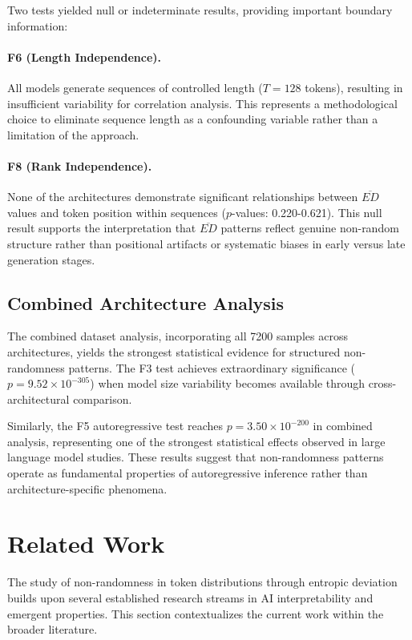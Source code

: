 \documentclass[12pt]{article}
\begin{document}
Two tests yielded null or indeterminate results, providing important boundary information:

\paragraph{F6 (Length Independence).} 
All models generate sequences of controlled length ($T = 128$ tokens), resulting in insufficient variability for correlation analysis. This represents a methodological choice to eliminate sequence length as a confounding variable rather than a limitation of the approach.

\paragraph{F8 (Rank Independence).}
None of the architectures demonstrate significant relationships between $\overline{ED}$ values and token position within sequences ($p$-values: 0.220-0.621). This null result supports the interpretation that $\overline{ED}$ patterns reflect genuine non-random structure rather than positional artifacts or systematic biases in early versus late generation stages.

\subsection{Combined Architecture Analysis}

The combined dataset analysis, incorporating all 7200 samples across architectures, yields the strongest statistical evidence for structured non-randomness patterns. The F3 test achieves extraordinary significance ($p = 9.52 \times 10^{-305}$) when model size variability becomes available through cross-architectural comparison.

Similarly, the F5 autoregressive test reaches $p = 3.50 \times 10^{-200}$ in combined analysis, representing one of the strongest statistical effects observed in large language model studies. These results suggest that non-randomness patterns operate as fundamental properties of autoregressive inference rather than architecture-specific phenomena.

\section{Related Work}

The study of non-randomness in token distributions through entropic deviation builds upon several established research streams in AI interpretability and emergent properties. This section contextualizes the current work within the broader literature.
\end{document}
